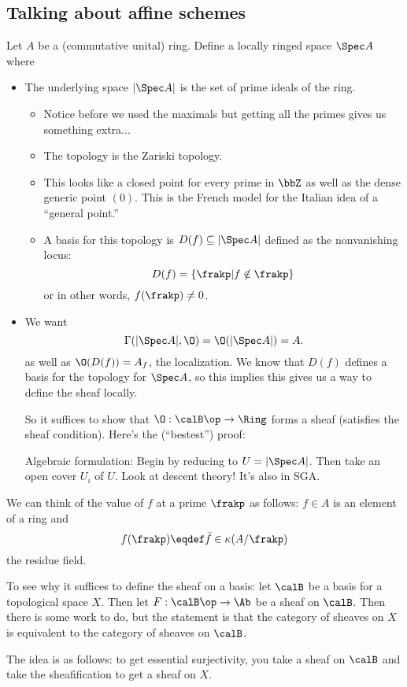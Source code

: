 \documentclass[12pt]{article}
\begin{document}
\subsection{Talking about affine schemes}
Let $A$ be a (commutative unital) ring. Define a locally ringed space $\Spec A$ where 
\begin{itemize}
	\item The underlying space $|\Spec A|$ is the set of prime ideals of the ring.
	\begin{itemize}	
		\item Notice before we used the maximals but getting all the primes gives us something extra...
		\item The topology is the Zariski topology.
		\item This looks like a closed point for every prime in $\bbZ$ as well as the dense generic point $(0)$. This is the French model for the Italian idea of a ``general point.''
		\item A basis for this topology is $D(f)\subseteq |\Spec A|$ defined as the nonvanishing locus:
		\[D(f)=\{\frakp|f\notin\frakp\}\]
		or in other words, $f(\frakp)\ne 0$.
	\end{itemize}
	\item We want 
	\[\Gamma(|\Spec A|,\O)=\O(|\Spec A|)=A.\]
	as well as $\O(D(f))=A_f$, the localization. We know that $D(f)$ defines a basis for the topology for $\Spec A$, so this implies
	this gives us a way to define the sheaf locally.

	So it suffices to show that $\O:\calB\op\to\Ring$ forms a sheaf (satisfies the sheaf condition). Here's the (``bestest'') proof:
	\begin{prf}[Bestest]
		Algebraic formulation: Begin by reducing to $U=|\Spec A|$. Then take an open cover $U_i$ of $U$. Look at descent theory! It's also in SGA.
	\end{prf}
\end{itemize}
\begin{rmk}
	We can think of the value of $f$ at a prime $\frakp$ as follows: $f\in A$ is an element of a ring and 
	\[f(\frakp)\eqdef \bar f\in \kappa(A/\frakp)\]
	the residue field.
\end{rmk}
\begin{rmk}
	To see why it suffices to define the sheaf on a basis: let $\calB$ be a basis for a topological space $X$. Then let $F:\calB\op\to \Ab$ be a sheaf 
	on $\calB$. Then there is some work to do, but the statement is that the category of sheaves on $X$ is equivalent to the category of sheaves on $\calB$.

	The idea is as follows: to get essential surjectivity, you take a sheaf on $\calB$ and take the sheafification to get a sheaf on $X$. 
\end{rmk}
\end{document}
